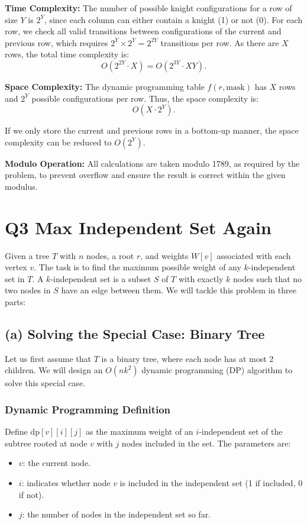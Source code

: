 \documentclass[11pt]{article}
\begin{document}
\textbf{Time Complexity:} The number of possible knight configurations for a row of size \( Y \) is \( 2^Y \), since each column can either contain a knight (1) or not (0). For each row, we check all valid transitions between configurations of the current and previous row, which requires \( 2^Y \times 2^Y = 2^{2Y} \) transitions per row. As there are \( X \) rows, the total time complexity is:
\[
O(2^{2Y} \cdot X) = O(2^{3Y} \cdot XY).
\]

\textbf{Space Complexity:} The dynamic programming table \( f(r, \text{mask}) \) has \( X \) rows and \( 2^Y \) possible configurations per row. Thus, the space complexity is:
\[
O(X \cdot 2^Y).
\]

If we only store the current and previous rows in a bottom-up manner, the space complexity can be reduced to \( O(2^Y) \).

\textbf{Modulo Operation:} All calculations are taken modulo 1789, as required by the problem, to prevent overflow and ensure the result is correct within the given modulus.


\newpage


\section*{Q3 Max Independent Set Again}

Given a tree \( T \) with \( n \) nodes, a root \( r \), and weights \( W[v] \) associated with each vertex \( v \). The task is to find the maximum possible weight of any \( k \)-independent set in \( T \). A \( k \)-independent set is a subset \( S \) of \( T \) with exactly \( k \) nodes such that no two nodes in \( S \) have an edge between them. We will tackle this problem in three parts:

\subsection*{(a) Solving the Special Case: Binary Tree}

Let us first assume that \( T \) is a binary tree, where each node has at most 2 children. We will design an \( O(nk^2) \) dynamic programming (DP) algorithm to solve this special case.

\subsubsection*{Dynamic Programming Definition}

Define \( \text{dp}[v][i][j] \) as the maximum weight of an \( i \)-independent set of the subtree rooted at node \( v \) with \( j \) nodes included in the set. The parameters are:
\begin{itemize}
    \item \( v \): the current node.
    \item \( i \): indicates whether node \( v \) is included in the independent set (1 if included, 0 if not).
    \item \( j \): the number of nodes in the independent set so far.
\end{itemize}
\end{document}
